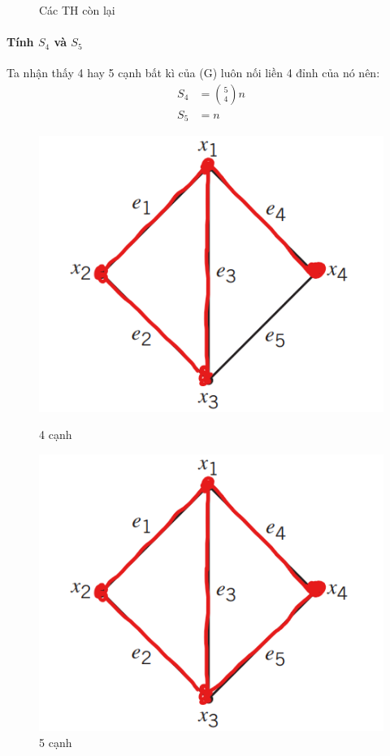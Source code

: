 \documentclass[main.tex]{subfiles}
\begin{document}
\begin{figure}[H]
\begin{minipage}{0.25\textwidth}
\captionsetup{labelformat=empty}
\caption{Các TH còn lại}
\end{minipage}
\end{figure}

\paragraph*{Tính $S_4$ và $S_5$} 
Ta nhận thấy 4 hay 5 cạnh bất kì của (G) luôn nối liền 4 đỉnh của nó nên:
$$
\begin{aligned}
    S_4 &= {5\choose4}n \\
    S_5 &= n    
\end{aligned}
$$

\begin{figure}[H]
\centering
\begin{minipage}{0.25\textwidth}
\includegraphics[width=\textwidth]{image/Bai6_S4.png}
\captionsetup{labelformat=empty}
\caption{4 cạnh}
\end{minipage}
\begin{minipage}{0.25\textwidth}
\includegraphics[width=\textwidth]{image/Bai6_S5.png}
\captionsetup{labelformat=empty}
\caption{5 cạnh}
\end{minipage}
\end{figure}
\end{document}
